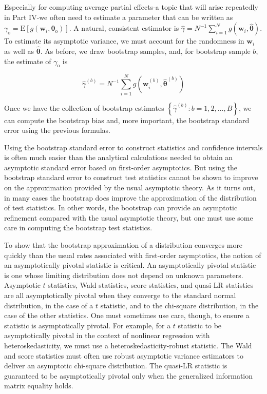 \documentclass[10pt]{article}
\begin{document}
Especially for computing average partial effects-a topic that will arise repeatedly in Part IV-we often need to estimate a parameter that can be written as $\gamma_{\mathrm{o}}= \mathrm{E}\left[g\left(\mathbf{w}_{i}, \boldsymbol{\theta}_{\mathrm{o}}\right)\right]$. A natural, consistent estimator is $\hat{\gamma}=N^{-1} \sum_{i=1}^{N} g\left(\mathbf{w}_{i}, \hat{\boldsymbol{\theta}}\right)$. To estimate its asymptotic variance, we must account for the randomness in $\mathbf{w}_{i}$ as well as $\hat{\boldsymbol{\theta}}$. As before, we draw bootstrap samples, and, for bootstrap sample $b$, the estimate of $\gamma_{\mathrm{o}}$ is

$$
\hat{\gamma}^{(b)}=N^{-1} \sum_{i=1}^{N} g\left(\mathbf{w}_{i}^{(b)}, \hat{\boldsymbol{\theta}}^{(b)}\right)
$$

Once we have the collection of bootstrap estimates $\left\{\hat{\gamma}^{(b)}: b=1,2, \ldots, B\right\}$, we can compute the bootstrap bias and, more important, the bootstrap standard error using the previous formulas.

Using the bootstrap standard error to construct statistics and confidence intervals is often much easier than the analytical calculations needed to obtain an asymptotic standard error based on first-order asymptotics. But using the bootstrap standard error to construct test statistics cannot be shown to improve on the approximation provided by the usual asymptotic theory. As it turns out, in many cases the bootstrap does improve the approximation of the distribution of test statistics. In other words, the bootstrap can provide an asymptotic refinement compared with the usual asymptotic theory, but one must use some care in computing the bootstrap test statistics.

To show that the bootstrap approximation of a distribution converges more quickly than the usual rates associated with first-order asymptotics, the notion of an asymptotically pivotal statistic is critical. An asymptotically pivotal statistic is one whose limiting distribution does not depend on unknown parameters. Asymptotic $t$ statistics, Wald statistics, score statistics, and quasi-LR statistics are all asymptotically pivotal when they converge to the standard normal distribution, in the case of a $t$ statistic, and to the chi-square distribution, in the case of the other statistics. One must sometimes use care, though, to ensure a statistic is asymptotically pivotal. For example, for a $t$ statistic to be asymptotically pivotal in the context of nonlinear regression with heteroskedasticity, we must use a heteroskedasticity-robust statistic. The Wald and score statistics must often use robust asymptotic variance estimators to deliver an asymptotic chi-square distribution. The quasi-LR statistic is guaranteed to be asymptotically pivotal only when the generalized information matrix equality holds.
\end{document}
